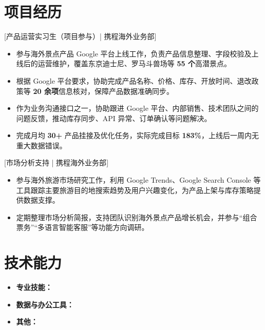 \documentclass{resume}
\begin{document}
\section{项目经历}

[\textnormal{产品运营实习生（项目参与）| 携程海外业务部}]

\begin{itemize}

\item 参与海外景点产品 Google 平台上线工作，负责产品信息整理、字段校验及上线后的运营维护，覆盖东京迪士尼、罗马斗兽场等 \textbf{55 个}高潜景点。

\item 根据 Google 平台要求，协助完成产品名称、价格、库存、开放时间、退改政策等 \textbf{20 余项}信息核对，保障产品数据准确同步。

\item 作为业务沟通接口之一，协助跟进 Google 平台、内部销售、技术团队之间的问题反馈，推动库存同步、API 异常、订单确认等问题解决。

\item 完成月均 \textbf{30+} 产品挂接及优化任务，实际完成目标 \textbf{183\%}，上线后一周内无重大数据错误。

\end{itemize}

[\textnormal{市场分析支持 | 携程海外业务部}]

\begin{itemize}

\item 参与海外旅游市场研究工作，利用 Google Trends、Google Search Console 等工具跟踪主要旅游目的地搜索趋势及用户兴趣变化，为产品上架与库存策略提供数据支撑。

\item 定期整理市场分析简报，支持团队识别海外景点产品增长机会，并参与“组合票务”“多语言智能客服”等功能方向调研。

\end{itemize}

\section[技术能力]{技术能力}

\begin{itemize}
  \item \textbf{专业技能：}
  \item \textbf{数据与办公工具：}
  \item \textbf{其他：}
\end{itemize}
\end{document}
